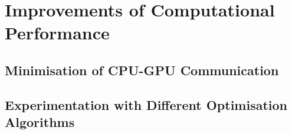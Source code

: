 \chapter{Improvements of Computational Performance}


\section{Minimisation of CPU-GPU Communication}

\section{Experimentation with Different Optimisation Algorithms}